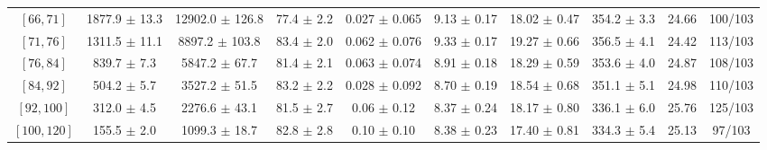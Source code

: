 \begin{tabular}{c||c|c|c|c|c|c|c||c|c}
$[66, 71]$ & 1877.9 $\pm$ 13.3 & 12902.0 $\pm$ 126.8 & 77.4 $\pm$ 2.2 & 0.027 $\pm$ 0.065 & 9.13 $\pm$ 0.17 & 18.02 $\pm$ 0.47 & 354.2 $\pm$ 3.3 & 24.66 & 100/103\\
$[71, 76]$ & 1311.5 $\pm$ 11.1 & 8897.2 $\pm$ 103.8 & 83.4 $\pm$ 2.0 & 0.062 $\pm$ 0.076 & 9.33 $\pm$ 0.17 & 19.27 $\pm$ 0.66 & 356.5 $\pm$ 4.1 & 24.42 & 113/103\\
$[76, 84]$ & 839.7 $\pm$ 7.3 & 5847.2 $\pm$ 67.7 & 81.4 $\pm$ 2.1 & 0.063 $\pm$ 0.074 & 8.91 $\pm$ 0.18 & 18.29 $\pm$ 0.59 & 353.6 $\pm$ 4.0 & 24.87 & 108/103\\
$[84, 92]$ & 504.2 $\pm$ 5.7 & 3527.2 $\pm$ 51.5 & 83.2 $\pm$ 2.2 & 0.028 $\pm$ 0.092 & 8.70 $\pm$ 0.19 & 18.54 $\pm$ 0.68 & 351.1 $\pm$ 5.1 & 24.98 & 110/103\\
$[92, 100]$ & 312.0 $\pm$ 4.5 & 2276.6 $\pm$ 43.1 & 81.5 $\pm$ 2.7 & 0.06 $\pm$ 0.12 & 8.37 $\pm$ 0.24 & 18.17 $\pm$ 0.80 & 336.1 $\pm$ 6.0 & 25.76 & 125/103\\
$[100, 120]$ & 155.5 $\pm$ 2.0 & 1099.3 $\pm$ 18.7 & 82.8 $\pm$ 2.8 & 0.10 $\pm$ 0.10 & 8.38 $\pm$ 0.23 & 17.40 $\pm$ 0.81 & 334.3 $\pm$ 5.4 & 25.13 & 97/103\\
\end{tabular}
